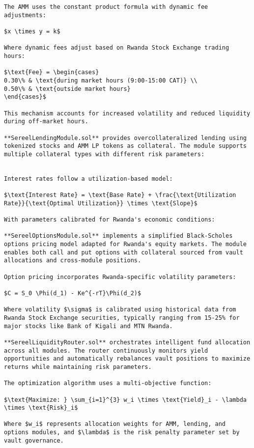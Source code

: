 \documentclass[12pt]{article}
\begin{document}
{{{\begin{itemize}
\begin{lstlisting}
The AMM uses the constant product formula with dynamic fee adjustments:

$x \times y = k$

Where dynamic fees adjust based on Rwanda Stock Exchange trading hours:

$\text{Fee} = \begin{cases}
0.30\% & \text{during market hours (9:00-15:00 CAT)} \\
0.50\% & \text{outside market hours}
\end{cases}$

This mechanism accounts for increased volatility and reduced liquidity during off-market hours.

**SereelLendingModule.sol** provides overcollateralized lending using tokenized stocks and AMM LP tokens as collateral. The module supports multiple collateral types with different risk parameters:


Interest rates follow a utilization-based model:

$\text{Interest Rate} = \text{Base Rate} + \frac{\text{Utilization Rate}}{\text{Optimal Utilization}} \times \text{Slope}$

With parameters calibrated for Rwanda's economic conditions:

**SereelOptionsModule.sol** implements a simplified Black-Scholes options pricing model adapted for Rwanda's equity markets. The module enables both call and put options with collateral sourced from vault allocations and cross-module positions.

Option pricing incorporates Rwanda-specific volatility parameters:

$C = S_0 \Phi(d_1) - Ke^{-rT}\Phi(d_2)$

Where volatility $\sigma$ is calibrated using historical data from Rwanda Stock Exchange securities, typically ranging from 15-25% for major stocks like Bank of Kigali and MTN Rwanda.

**SereelLiquidityRouter.sol** orchestrates intelligent fund allocation across all modules. The router continuously monitors yield opportunities and automatically rebalances vault positions to maximize returns while maintaining risk parameters.

The optimization algorithm uses a multi-objective function:

$\text{Maximize: } \sum_{i=1}^{3} w_i \times \text{Yield}_i - \lambda \times \text{Risk}_i$

Where $w_i$ represents allocation weights for AMM, lending, and options modules, and $\lambda$ is the risk penalty parameter set by vault governance.



\end{lstlisting}
\end{itemize}}}}
\end{document}
